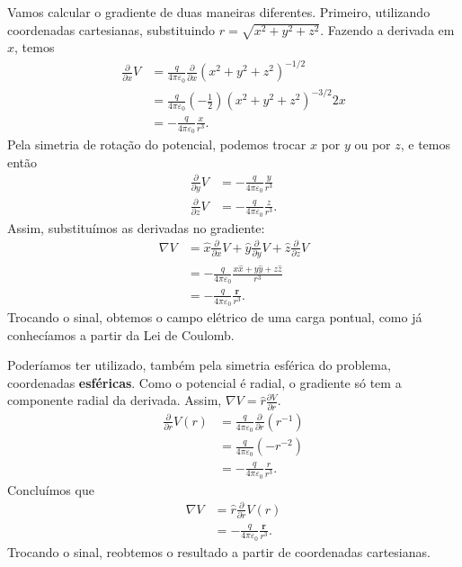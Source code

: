 \documentclass[11pt]{article}
\begin{document}
Vamos calcular o gradiente de duas maneiras diferentes. Primeiro,
utilizando coordenadas cartesianas, substituindo
\(r=\sqrt{x^2+y^2+z^2}\). Fazendo a derivada em \(x\), temos 
\begin{align}
  \frac{\partial}{\partial x} V &= \frac q{4\pi\varepsilon_0} \frac{\partial}{\partial x} (x^2+y^2+z^2)^{-1/2}\\
                  &= \frac q{4\pi\varepsilon_0} \left(-\frac12\right) (x^2+y^2+z^2)^{-3/2} 2x\\
                  &= -\frac q{4\pi\varepsilon_0} \frac x{r^3}.
\end{align}
Pela simetria de rotação do potencial, podemos trocar \(x\) por \(y\) ou por
\(z\), e temos então
\begin{align}
  \frac{\partial}{\partial y} V &= -\frac q{4\pi\varepsilon_0} \frac y{r^3}\\
  \frac{\partial}{\partial z} V &= -\frac q{4\pi\varepsilon_0} \frac z{r^3}.
\end{align}
Assim, substituímos as derivadas no gradiente:
\begin{align}
  \nabla V &= \hat x\frac{\partial}{\partial x} V+\hat y\frac{\partial}{\partial y} V+\hat z\frac{\partial}{\partial z} V\\
      &= -\frac q{4\pi\varepsilon_0} \frac{x\hat x+y\hat y+z\hat z}{r^3}\\
      &= -\frac q{4\pi\varepsilon_0} \frac{\mathbf r}{r^3}.
\end{align}
Trocando o sinal, obtemos o campo elétrico de uma carga pontual, como já
conhecíamos a partir da Lei de Coulomb.

Poderíamos ter utilizado, também pela simetria esférica do problema,
coordenadas \textbf{esféricas}. Como o potencial é radial, o gradiente só tem a
componente radial da derivada. Assim, \(\nabla V=\hat r\frac{\partial V}{\partial r}\).
\begin{align}
  \frac{\partial}{\partial r} V(r) &= \frac q{4\pi\varepsilon_0} \frac{\partial}{\partial r}(r^{-1})\\
                     &= \frac q{4\pi\varepsilon_0} (-r^{-2})\\
                     &= -\frac q{4\pi\varepsilon_0} \frac{r}{r^3}.
\end{align}
Concluímos que 
\begin{align}
  \nabla V &= \hat r\frac{\partial}{\partial r} V(r)\\
      &= -\frac q{4\pi\varepsilon_0} \frac{\mathbf r}{r^3}.
\end{align}
Trocando o sinal, reobtemos o resultado a partir de coordenadas
cartesianas. 
\end{document}

